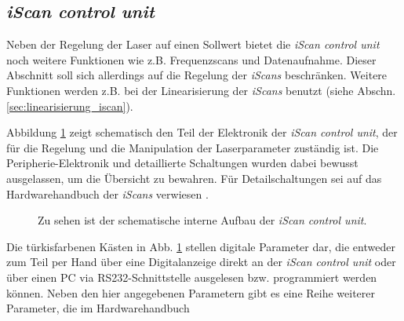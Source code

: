 \subsection{\textit{iScan control unit}}\label{subsec:iscan_control_unit}
Neben der Regelung der Laser auf einen Sollwert bietet die \textit{iScan control
unit} noch weitere Funktionen wie z.B. Frequenzscans und Datenaufnahme. Dieser
Abschnitt soll sich allerdings auf die Regelung der \textit{iScans} beschränken.
Weitere Funktionen werden z.B. bei der Linearisierung der \textit{iScans}
benutzt (siehe Abschn.
\ref{sec:linearisierung_iscan}).\par
Abbildung \ref{fig:iscan_control_unit_regelelektronik} zeigt schematisch den
Teil der Elektronik der \textit{iScan control unit}, der für die Regelung und
die Manipulation der Laserparameter zuständig ist. Die Peripherie-Elektronik und
detaillierte Schaltungen wurden dabei bewusst ausgelassen, um die Übersicht zu
bewahren. Für Detailschaltungen sei auf das Hardwarehandbuch der \textit{iScans}
verwiesen \cite{iscan_hardware_guide}.\par
\begin{figure}[h]
 	\centering
	\caption[Interner Aufbau der \textit{iScan control unit},
	schematisch]{Zu sehen ist der schematische interne Aufbau der \textit{iScan
	control unit}.}\label{fig:iscan_control_unit_regelelektronik}
\end{figure}
Die türkisfarbenen Kästen in Abb. \ref{fig:iscan_control_unit_regelelektronik}
stellen digitale Parameter dar, die entweder zum Teil per Hand über eine Digitalanzeige
direkt an der \textit{iScan control unit} oder über einen PC via
RS232-Schnittstelle ausgelesen bzw. programmiert werden können. Neben den hier angegebenen
Parametern gibt es eine Reihe weiterer Parameter, die im Hardwarehandbuch
